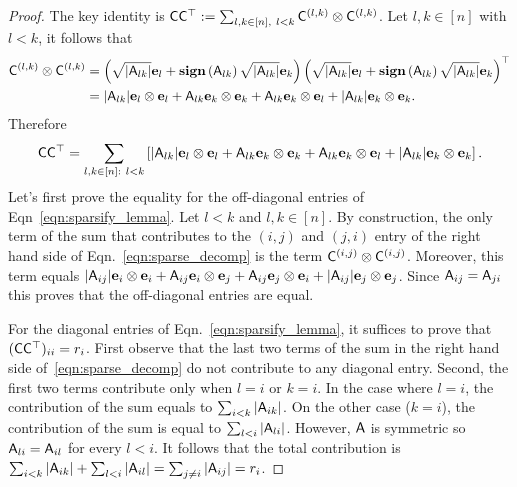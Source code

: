 \begin{proof}
The key identity is ${\mathsf{C} }{\mathsf{C} }^\top : = \sum_{l,k\in{[n]},\ l<k} {\mathsf{C} }^{(l,k)} \otimes {\ensuremath{\mathsf{C} }}^{(l,k)}$. Let $l,k\in{[n]}$ with $l<k$, it follows that
\begin{align*}
{\ensuremath{\mathsf{C} }}^{(l,k)} \otimes {\ensuremath{\mathsf{C} }}^{(l,k)}   & =  \left(\sqrt{|{\mathsf{A} }_{lk}|} {\mathbf e}_l + \operatorname{\textbf{sign}}\left({\mathsf{A} }_{lk}\right)  \sqrt{|{\mathsf{A} }_{lk}|} {\mathbf e}_k \right)\left(\sqrt{|{\mathsf{A} }_{lk}|} {\mathbf e}_l + \operatorname{\textbf{sign}}\left({\mathsf{A} }_{lk}\right)  \sqrt{|{\mathsf{A} }_{lk}|} {\mathbf e}_k\right)^\top\\
 & =  |{\mathsf{A} }_{lk}| {\mathbf e}_l \otimes {\mathbf e}_l + {\mathsf{A} }_{lk} {\mathbf e}_k \otimes {\mathbf e}_k + {\mathsf{A} }_{lk} {\mathbf e}_k \otimes {\mathbf e}_l + |{\mathsf{A} }_{lk}| {\mathbf e}_k \otimes {\mathbf e}_k.
\end{align*}
Therefore
\begin{equation}\label{eqn:sparse_decomp}
 {\ensuremath{\mathsf{C} }}{\ensuremath{\mathsf{C} }}^\top = \sum_{l,k\in{[n]}:\ l< k }\left[|{\mathsf{A} }_{lk}| {\mathbf e}_l \otimes {\mathbf e}_l + {\mathsf{A} }_{lk} {\mathbf e}_k \otimes {\mathbf e}_k + {\mathsf{A} }_{lk} {\mathbf e}_k \otimes {\mathbf e}_l + |{\mathsf{A} }_{lk}| {\mathbf e}_k \otimes {\mathbf e}_k\right].
\end{equation}
Let's first prove the equality for the off-diagonal entries of Eqn~\eqref{eqn:sparsify_lemma}. Let $l<k$ and $l,k\in{[n]}$. By construction, the only term of the sum that contributes to the $(i,j)$ and $(j,i)$ entry of the right hand side of Eqn.~\eqref{eqn:sparse_decomp} is the term ${\mathsf{C} }^{(i,j)} \otimes {\ensuremath{\mathsf{C} }}^{(i,j)} $. Moreover, this term equals $|{\mathsf{A} }_{ij}| {\mathbf e}_i \otimes {\mathbf e}_i + {\mathsf{A} }_{ij} {\mathbf e}_i \otimes {\mathbf e}_j + {\mathsf{A} }_{ij} {\mathbf e}_j \otimes {\mathbf e}_i + |{\mathsf{A} }_{ij}| {\mathbf e}_j \otimes {\mathbf e}_j$. Since ${\mathsf{A} }_{ij} = {\mathsf{A} }_{ji}$ this proves that the off-diagonal entries are equal.
%

%
For the diagonal entries of Eqn.~\eqref{eqn:sparsify_lemma}, it suffices to prove that $({\mathsf{C} }{\mathsf{C} }^\top)_{ii} = r_i$. First observe that the last two terms of the sum in the right hand side of~\eqref{eqn:sparse_decomp} do not contribute to any diagonal entry. Second, the first two terms contribute only when $l=i$ or $k=i$. In the case where $l=i$, the contribution of the sum equals to $\sum_{i<k} |{\mathsf{A} }_{ik}|$. On the other case ($k=i$), the contribution of the sum is equal to $\sum_{l<i} |{\mathsf{A} }_{li}|$. However, ${\mathsf{A} }$ is symmetric so ${\mathsf{A} }_{li} = {\mathsf{A} }_{il}$ for every $l<i$. It follows that the total contribution is $\sum_{i<k} |{\mathsf{A} }_{ik}| + \sum_{l<i} |{\mathsf{A} }_{il}| = \sum_{j\neq i} |{\mathsf{A} }_{ij}| = r_i$.
\end{proof}
